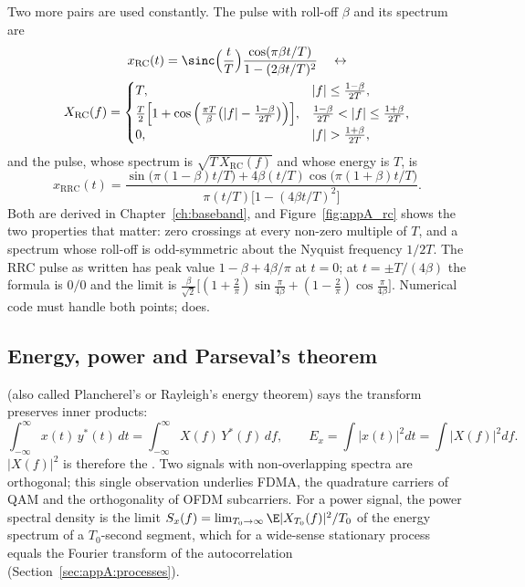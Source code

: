 Two more pairs are used constantly. The  pulse with roll-off $\beta$ and its
spectrum are
\begin{gather}
x_{\mathrm{RC}}(t)=\sinc\Big(\frac tT\Big)\frac{\cos(\pi\beta t/T)}{1-(2\beta t/T)^2}
\quad\leftrightarrow\notag\\
X_{\mathrm{RC}}(f)=\begin{cases}T,& |f|\le\frac{1-\beta}{2T},\\[2pt]
\frac T2\Big[1+\cos\Big(\frac{\pi T}{\beta}\big(|f|-\frac{1-\beta}{2T}\big)\Big)\Big],&\frac{1-\beta}{2T}<|f|\le\frac{1+\beta}{2T},\\[2pt]
0,&|f|>\frac{1+\beta}{2T},\end{cases}
\label{eq:appA:rc}
\end{gather}
and the  pulse, whose spectrum is $\sqrt{T\,X_{\mathrm{RC}}(f)}$ and whose
energy is $T$, is
\begin{equation}
x_{\mathrm{RRC}}(t)=\frac{\sin\big(\pi(1-\beta)t/T\big)+4\beta(t/T)\cos\big(\pi(1+\beta)t/T\big)}{\pi(t/T)\big[1-(4\beta t/T)^2\big]}.
\label{eq:appA:rrc}
\end{equation}
Both are derived in Chapter~\ref{ch:baseband}, and Figure~\ref{fig:appA_rc} shows the two
properties that matter: zero crossings at every non-zero multiple of $T$, and a spectrum whose
roll-off is odd-symmetric about the Nyquist frequency $1/2T$.
The RRC pulse as written has peak value $1-\beta+4\beta/\pi$ at $t=0$; at $t=\pm T/(4\beta)$ the
formula is $0/0$ and the limit is
$\frac{\beta}{\sqrt2}\big[(1+\tfrac2\pi)\sin\tfrac{\pi}{4\beta}+(1-\tfrac2\pi)\cos\tfrac{\pi}{4\beta}\big]$.
Numerical code must handle both points;  does.


\subsection{Energy, power and Parseval's theorem}

 (also called Plancherel's or Rayleigh's energy theorem) says the
transform preserves inner products:
\begin{equation}
\int_{-\infty}^{\infty}x(t)\,y^*(t)\,dt=\int_{-\infty}^{\infty}X(f)\,Y^*(f)\,df,\qquad
E_x=\int|x(t)|^2dt=\int|X(f)|^2df.
\label{eq:appA:parseval}
\end{equation}
$|X(f)|^2$ is therefore the . Two signals with non-overlapping
spectra are orthogonal; this single observation underlies FDMA, the quadrature carriers of QAM
and the orthogonality of OFDM subcarriers. For a power signal, the power spectral density is
the limit $S_x(f)=\lim_{T_0\to\infty}\E|X_{T_0}(f)|^2/T_0$ of the energy spectrum of a
$T_0$-second segment, which for a wide-sense stationary process equals the Fourier transform of
the autocorrelation (Section~\ref{sec:appA:processes}).


